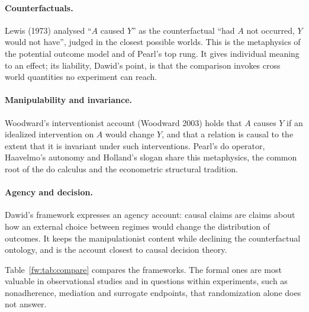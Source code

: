 \paragraph{Counterfactuals.} Lewis (1973) analysed ``$A$ caused $Y$'' as the counterfactual ``had $A$ not occurred, $Y$ would not have'', judged in the closest possible worlds. This is the metaphysics of the potential outcome model and of Pearl's top rung. It gives individual meaning to an effect; its liability, Dawid's point, is that the comparison invokes cross world quantities no experiment can reach.

\paragraph{Manipulability and invariance.} Woodward's interventionist account (Woodward 2003) holds that $A$ causes $Y$ if an idealized intervention on $A$ would change $Y$, and that a relation is causal to the extent that it is invariant under such interventions. Pearl's do operator, Haavelmo's autonomy and Holland's slogan share this metaphysics, the common root of the do calculus and the econometric structural tradition.

\paragraph{Agency and decision.} Dawid's framework expresses an agency account: causal claims are claims about how an external choice between regimes would change the distribution of outcomes. It keeps the manipulationist content while declining the counterfactual ontology, and is the account closest to causal decision theory.

Table~\ref{fw:tab:compare} compares the frameworks. The formal ones are most valuable in observational studies and in questions within experiments, such as nonadherence, mediation and surrogate endpoints, that randomization alone does not answer.

